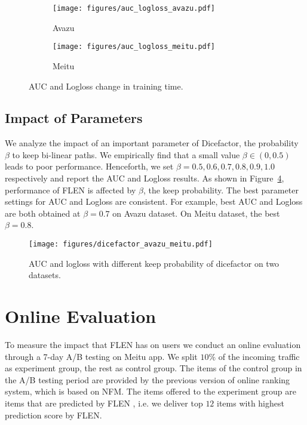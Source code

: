 \documentclass[sigconf]{acmart}
\begin{document}
\begin{figure}[htbp]
	\centering
	\begin{subfigure}[b]{\columnwidth}
		\centering
		\texttt{[image: figures/auc\_logloss\_avazu.pdf]}
		\caption{Avazu}
		\label{fig:convergeavazu}
	\end{subfigure} \hspace{-7pt}
	
	\begin{subfigure}[b]{\columnwidth}
		\centering
		\texttt{[image: figures/auc\_logloss\_meitu.pdf]}
		\caption{Meitu}
		\label{fig:convergemeitu}
	\end{subfigure}  \hspace{-7pt}
	\caption{AUC and Logloss change in training time.}
	\label{fig:converge}
\end{figure}

\subsection{Impact of Parameters}
We analyze the impact of an important parameter of Dicefactor, the probability $\beta$ to keep bi-linear paths. 
We empirically find that a small value $\beta \in (0,0.5)$ leads to poor performance.
Henceforth, we set $\beta=0.5,0.6,0.7,0.8,0.9,1.0$ respectively and report the AUC and Logloss results.  
As shown in Figure~\ref{fig:dicefactor}, performance of FLEN is affected by $\beta$, the keep probability. 
The best parameter settings for AUC and Logloss are consistent. For example, best AUC and Logloss are both obtained at $\beta=0.7$ on Avazu dataset. On Meitu dataset, the best $\beta=0.8$. 

\begin{figure}
\centering\texttt{[image: figures/dicefactor\_avazu\_meitu.pdf]}
\caption{AUC and logloss with different keep probability of dicefactor on two datasets. }
\label{fig:dicefactor}
\end{figure}


\section{Online Evaluation}

To measure the impact that FLEN has on users we conduct an online evaluation through a 7-day A/B testing on Meitu app. We split $10\%$ of the incoming traffic as experiment group, the rest as control group. 
The items of the control group in the A/B testing period are provided by the previous version of online ranking system, which is based on NFM. 
The items offered to the experiment group are items that are predicted by FLEN , i.e. we deliver top $12$ items with highest prediction score by FLEN. 
\end{document}
